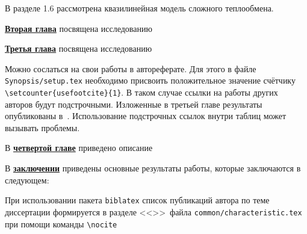 В разделе 1.6 рассмотрена квазилинейная модель сложного теплообмена.



\underline{\textbf{Вторая глава}} посвящена исследованию

\underline{\textbf{Третья глава}} посвящена исследованию

Можно сослаться на свои работы в автореферате. Для этого в файле
\verb!Synopsis/setup.tex! необходимо присвоить положительное значение
счётчику \verb!\setcounter{usefootcite}{1}!. В таком случае ссылки на
работы других авторов будут подстрочными.
Изложенные в третьей главе результаты опубликованы в~\cite{vakbib1, vakbib2}.
Использование подстрочных ссылок внутри таблиц может вызывать проблемы.

В \underline{\textbf{четвертой главе}} приведено описание

\FloatBarrier
{}                                  %
В \underline{\textbf{заключении}} приведены основные результаты работы, которые заключаются в следующем:


При использовании пакета \verb!biblatex! список публикаций автора по теме
диссертации формируется в разделе <<\publications>>\ файла
\verb!common/characteristic.tex!  при помощи команды \verb!\nocite!

